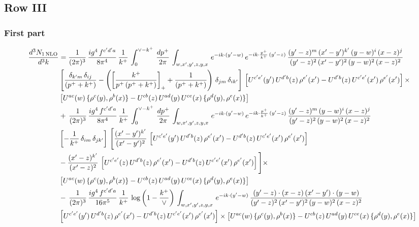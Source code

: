 \documentclass[9pt]{article}
\numberwithin{equation}{section}
\begin{document}
 \subsection{Row III}
\subsubsection{First part}
\begin{align}
     \frac{d^{3}N_{1\,\rm NLO}}{d^{3}k} & =  \frac{1}{(2\pi)^{3}}\, \frac{ig^{4}\,f^{c'd'a}}{8\pi^{4}}\, \frac{1}{k^{+}}\,\int_{0}^{\vee-k^{+}}\,  \frac{dp^{+}}{2\pi}\, \int_{w,x',y',z,y,x}\, e^{-ik\cdot (y'-w)}\, e^{-ik\cdot \frac{p^{+}}{k^{+}}\,(y'-z)}\,\frac{(y'-z)^{m}\,(x'-y')^{k'}\,(y-w)^{i}\,(x-z)^{j}}{(y'-z)^{2}\,(x'-y')^{2}\,(y-w)^{2}\,(x-z)^{2}}\notag \\ & \left[\frac{\delta_{k'm}\,\delta_{ij}}{(p^{+}+k^{+})}-\left(\left[\frac{k^{+}}{p^{+}\,(p^{+}+k^{+})}\right]_{+}+\frac{1}{(p^{+}+k^{+})}\right)\,\delta_{jm}\,\delta_{ik'}\right]\, \left[U^{c'e'}(y')\,U^{d'b}(z)\,\rho^{e'}(x')-U^{d'b}(z)\,U^{c'e'}(x')\,\rho^{e'}(x')\right]\times\notag \\ &  \left[U^{ac}(w)\, \{\rho^{c}(y),\rho^{b}(x)\}-U^{cb}(z)\,U^{ad}(y)\,U^{ce}(x)\,\{\rho^{d}(y),\rho^{e}(x)\}\right] \notag \\
&  +\,\frac{1}{(2\pi)^{3}}\, \frac{ig^{4}\,f^{c'd'a}}{8\pi^{4}}\, \frac{1}{k^{+}}\,\int_{0}^{\vee-k^{+}}\,  \frac{dp^{+}}{2\pi}\, \int_{w,x',y',z,y,x}\, e^{-ik\cdot (y'-w)}\, e^{-ik\cdot \frac{p^{+}}{k^{+}}\,(y'-z)}\,\frac{(y'-z)^{m}\,(y-w)^{i}\,(x-z)^{j}}{(y'-z)^{2}\,(y-w)^{2}\,(x-z)^{2}}\notag \\ &   \left[-\frac{1}{k^{+}}\, \delta_{im}\, \delta_{jk'}\right]\, \Bigg[\frac{(x'-y')^{k'}}{(x'-y')^{2}}\,\left[U^{c'e'}(y')\,U^{d'b}(z)\,\rho^{e'}(x')-U^{d'b}(z)\,U^{c'e'}(x')\,\rho^{e'}(x')\right]\notag \\ & -\frac{(x'-z)^{k'}}{(x'-z)^{2}}\,\left[U^{c'e'}(z)\,U^{d'b}(z)\,\rho^{e'}(x')-U^{d'b}(z)\,U^{c'e'}(x')\,\rho^{e'}(x')\right]\Bigg]\times\notag \\ &   \left[U^{ac}(w)\, \{\rho^{c}(y),\rho^{b}(x)\}-U^{cb}(z)\,U^{ad}(y)\,U^{ce}(x)\,\{\rho^{d}(y),\rho^{e}(x)\}\right] \notag \\
& -\,\frac{1}{(2\pi)^{3}}\, \frac{ig^{4}\,f^{c'd'a}}{16\pi^{5}}\, \frac{1}{k^{+}}\,\log{\left(1-\frac{k^{+}}{\vee}\right)}\, \int_{w,x',y',z,y,x}\, e^{-ik\cdot (y'-w)}\,\frac{(y'-z)\cdot (x-z)\,(x'-y')\cdot (y-w)}{(y'-z)^{2}\,(x'-y')^{2}\,(y-w)^{2}\,(x-z)^{2}}\notag \\ &  \left[U^{c'e'}(y')\,U^{d'b}(z)\,\rho^{e'}(x')-U^{d'b}(z)\,U^{c'e'}(x')\,\rho^{e'}(x')\right]\times  \left[U^{ac}(w)\, \{\rho^{c}(y),\rho^{b}(x)\}-U^{cb}(z)\,U^{ad}(y)\,U^{ce}(x)\,\{\rho^{d}(y),\rho^{e}(x)\}\right]
\end{align}
\end{document}
